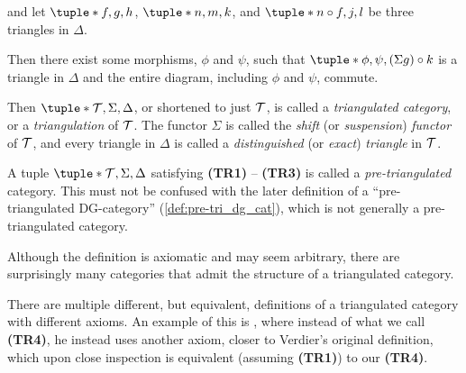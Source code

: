 \begin{definition}
\begin{enumerate}[label={(\bfseries TR\arabic*)}]
{\begin{center}
            \end{center}
            and let \( \tuple*{f, g, h} \), \( \tuple*{n, m, k} \), and \( \tuple*{n \circ f, j, l} \) be three triangles in \( \Delta \).

            Then there exist some morphisms, \( \phi \) and \( \psi \), such that \( \tuple*{\phi, \psi, (\Sigma g) \circ k} \) is a triangle in \( \Delta \) and the entire diagram, including \( \phi \) and \( \psi \), commute.
        }
    \end{enumerate}

    Then \( \tuple*{ \Tc, \Sigma, \Delta } \), or shortened to just \( {\mathcal{T}} \), is called a \emph{triangulated category}, or a \emph{triangulation} of \( {\mathcal{T}} \). The functor \( \Sigma \) is called the \emph{shift} (or \emph{suspension}) \emph{functor} of \( {\mathcal{T}} \), and every triangle in \( \Delta \) is called a \emph{distinguished} (or \emph{exact}) \emph{triangle} in \( {\mathcal{T}} \). 
\end{definition}

A tuple \( \tuple*{\Tc, \Sigma, \Delta} \) satisfying {\bf (TR1)} -- {\bf (TR3)} is called a \emph{pre-triangulated} category. This must not be confused with the later definition of a ``pre-triangulated DG-category'' (\autoref{def:pre-tri_dg_cat}), which is not generally a pre-triangulated category.

Although the definition is axiomatic and may seem arbitrary, there are surprisingly many categories that admit the structure of a triangulated category.

There are multiple different, but equivalent, definitions of a triangulated category with different axioms. An example of this is \cite[Definition 2.1]{May_2001}, where instead of what we call {\bf (TR4)}, he instead uses another axiom, closer to Verdier's original definition, which upon close inspection is equivalent (assuming {\bf (TR1)}) to our {\bf (TR4)}.

